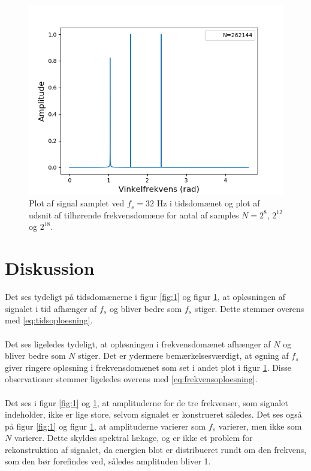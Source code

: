 \begin{figure}[H]
\begin{minipage}{0.49\textwidth}
\includegraphics[width=\textwidth]{figures/frekvensanalyse/32hz_freq3.png}
\end{minipage}
\caption{Plot af signal samplet ved $f_s=32$ Hz i tidsdomænet og plot af udsnit af tilhørende frekvensdomæne for antal af samples $N=2^8$, $2^{12}$ og $2^{18}$.}
\label{fig:2}
\end{figure}
\section{Diskussion}
Det ses tydeligt på tidsdomænerne i figur \ref{fig:1} og figur \ref{fig:2}, at opløsningen af signalet i tid afhænger af $f_s$ og bliver bedre som $f_s$ stiger. Dette stemmer overens med \eqref{eq:tidsoploesning}.\\\\
Det ses ligeledes tydeligt, at opløsningen i frekvensdomænet afhænger af $N$ og bliver bedre som $N$ stiger. Det er ydermere bemærkelsesværdigt, at øgning af $f_s$ giver ringere opløsning i frekvensdomænet som set i andet plot i figur \ref{fig:2}. Disse observationer stemmer ligeledes overens med \eqref{eq:frekvensoploesning}.\\\\
Det ses i figur \ref{fig:1} og \ref{fig:2}, at amplituderne for de tre frekvenser, som signalet indeholder, ikke er lige store, selvom signalet er konstrueret således. Det ses også på figur \ref{fig:1} og figur \ref{fig:2}, at amplituderne varierer som $f_s$ varierer, men ikke som $N$ varierer. Dette skyldes spektral lækage, og er ikke et problem for rekonstruktion af signalet, da energien blot er distribueret rundt om den frekvens, som den bør forefindes ved, således amplituden bliver 1.

